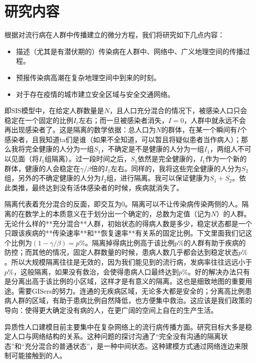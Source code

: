 \chapter{研究内容}

根据对流行病在人群中传播建立的微分方程，我们将研究如下几点内容：

\begin{itemize}
    \item 描述（尤其是有潜伏期的）传染病在人群中、网络中、广义地理空间的传播过程。
    \item 预报传染病高潮在复杂地理空间中到来的时刻。
    \item 对于存在疫情的城市建立安全区域与安全交通网络。
\end{itemize}

即SIS模型中，在给定人群数量是$N$，且人口充分混合的情况下，被感染人口只会稳定在一个固定的比例$I_e$左右；而一旦被感染者消失，$I=0$，人群中就永远不会再出现感染者了。这是隔离的数学依据：总人口为$N$的群体，在某一个瞬间有$I$个感染者，且我知道ta们是谁（如果不全知道，可以暂且将疑似患者当作病人）；那么我将完全健康的人分为一组$S_1$，不确定是不是健康的人分为一组$I_1$，两组人不可以见面（将$I_1$组隔离）。过一段时间之后，$S_1$依然是完全健康的，$I_1$作为一个新的群体，健康的人会稳定在$\gamma/\beta$倍的$I_1$左右。同样的，我将这些完全健康的人分为$S_2$组，另外的不确定健康的人分为$I_2$组，进行隔离。我可以保证健康为$S_1+S_2$。依此类推，最终达到没有活体感染者的时候，疾病就消失了。

隔离代表着充分混合的反面，即交互为0。隔离可以不让传染病传染两侧的人。隔离的在数学上的本质意义在于划分出一个确定的，总数为定值（记为$N$）的人群。无论什么样的**充分混合**人群，初始状态的得病人数是多少，稳定状态都是一个只跟该疾病的**传染速率**和**恢复速率**有关系的固定比例。下文里面我们记这个比例为$(1-\gamma/\beta) = p\%$。隔离掉得病比例高于该比例$p\%$的人群有助于疾病的防控；而其他的情况，固定人群数量的时候，患病人数几乎都会达到稳定状态$p\%$。所以大规模隔离往往是无效的，因为我们能见到的流行病，发病率往往远远小于$p\%$，这般隔离，如果没有救治，会使得患病人口最终达到$p\%$。好的解决办法只有是分离出高于该比例的小区域，这样才是有意义的隔离。这也是细致地图的重要用途。需要GISers的努力。连通的无疾病区域，无论多大都是安全的；分离高比例患病人群的区域，有助于患病比例自然降低，也方便集中救治。这应该是我们政策的导向：使得更大确定没有病的人，在更广阔的空间上自在的生产生活。

异质性人口建模目前主要集中在复杂网络上的流行病传播方面。研究目标大多是稳定人口与网络结构的关系。这种问题的探讨沟通了“完全没有沟通的隔离状态”和“充分混合的普通状态”，是一种中间状态。这种建模方式通过网络连边来限制可能接触到的人。

